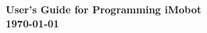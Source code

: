\documentclass[11pt]{report}
\begin{document}
\thispagestyle{empty}
\begin{center}


\vspace{0.5in}
{\Huge\sf\bf User's Guide for Programming iMobot} \\
\vspace{2.0in}
{\large\sf\bf\today}
\end{center}

\pagebreak

\begin{abstract} 
This library implements control functions for controlling an iMobot
robotic module.

\end{abstract}
\pagebreak

\setcounter{page}{1}
\tableofcontents
\pagebreak

\setcounter{page}{1}
\pagebreak

\end{document}
